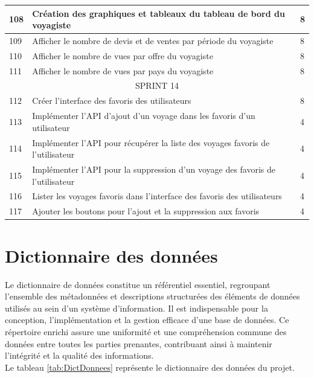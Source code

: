 \documentclass[12pt]{report}
\begin{document}
\begin{longtable}{|p{1cm}|p{7cm}|p{6cm}|}
						\hline
						108 & Création des graphiques et tableaux du tableau de bord du voyagiste & 8\\
						\hline
						109 & Afficher le nombre de devis et de ventes par période du voyagiste & 8\\
						\hline
						110 & Afficher le nombre de vues par offre du voyagiste & 8\\
						\hline
						111 & Afficher le nombre de vues par pays du voyagiste & 8\\
						\hline
						\multicolumn{3}{|c|}{SPRINT 14}\\
						\hline
						112 & Créer l'interface des favoris des utilisateurs & 8\\
						\hline
						113 & Implémenter l'API d'ajout d'un voyage dans les favoris d'un utilisateur & 4\\
						\hline
						114 & Implémenter l'API pour récupérer la liste des voyages favoris de l'utilisateur & 4\\
						\hline
						115 & Implémenter l'API pour la suppression d'un voyage des favoris de l'utilisateur & 4\\
						\hline
						116 & Lister les voyages favoris dans l'interface des favoris des utilisateurs & 4\\
						\hline
						117 & Ajouter les boutons pour l'ajout et la suppression aux favoris & 4\\
						\hline
				    \end{longtable}


				\section{Dictionnaire des données}

				\hspace{15pt} Le dictionnaire de données constitue un référentiel essentiel, regroupant l'ensemble des métadonnées et descriptions structurées des éléments de données utilisés au sein d'un système d'information. Il est indispensable pour la conception, l'implémentation et la gestion efficace d'une base de données. Ce répertoire enrichi assure une uniformité et une compréhension commune des données entre toutes les parties prenantes, contribuant ainsi à maintenir l'intégrité et la qualité des informations.\\

				Le tableau \ref{tab:DictDonnees} représente le dictionnaire des données du projet.
\end{document}
